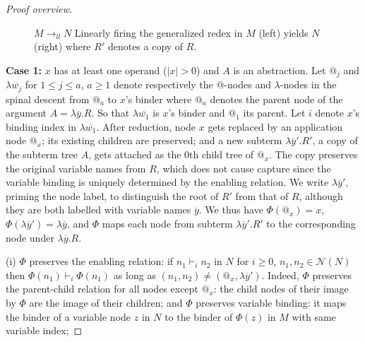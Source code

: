 \documentclass[xchauthor,chkrefs,GCNS,amsmath,amsthm,rotating,leaveRGB]{tcsg}
\theoremstyle{plain}
\theoremstyle{definition}
\newcommand{\Nodes}{\mathcal{N}}
\newcommand{\enables}{\vdash}
\newcommand{\llred}{\rightarrow_{ll}}
\begin{document}
\begin{proof}[Proof overview]
\begin{figure}
\begin{sgmlfig}
\end{sgmlfig}
\caption{$M\llred N$ Linearly firing the generalized redex in $M$ (left) yields
$N$ (right) where $R'$ denotes a copy of $R$.}\label{fig3}
\end{figure}

\textbf{Case 1:} $x$ has at least one operand ($|x|>0$) and $A$ is an
abstraction. Let $@_{j}$ and $\lambda \overline{w_{j}}$ for $1\leq j\leq a$,
$a\geq 1$ denote respectively the @-nodes and $\lambda $-nodes in the spinal
descent from $@_{a}$ to $x$'s binder where $@_{a}$ denotes the parent node of
the argument $A = \lambda \overline{y}. R$. So that $\lambda
\overline{w_{1}}$ is $x$'s binder and $@_{1}$ its parent. Let $i$ denote
$x$'s binding index in $\lambda \overline{w_{1}}$. After reduction, node $x$
gets replaced by an application node $@_{x}$; its existing children are
preserved; and a new subterm $\lambda \overline{y}'. R'$, a copy of the
subterm tree $A$, gets attached as the $0$th child tree of $@_{x}$. The copy
preserves the original variable names from $R$, which does not cause capture
since the variable binding is uniquely determined by the enabling relation.
We write $\lambda \overline{y}'$, priming the node label, to distinguish the
root of $R'$ from that of $R$, although they are both labelled with variable
names $\overline{y}$. We thus have $\Phi (@_{x}) = x$, $\Phi (\lambda
\overline{y}') = \lambda \overline{y}$, and $\Phi $ maps each node from
subterm $\lambda \overline{y}'. R'$  to the corresponding node under $\lambda
\overline{y}.R$.


(i) $\Phi $ preserves the enabling relation: if $n_{1} \enables _{i} n_{2}$
in $N$ for $i\geq 0$, $n_{1},n_{2} \in \Nodes (N)$ then $\Phi (n_{1})
\enables _{i} \Phi (n_{1})$ as long as $(n_{1},n_{2}) \neq (@_{x},\lambda
\overline{y}')$. Indeed, $\Phi $ preserves the parent-child relation for all
nodes except $@_{x}$: the child nodes of their image by $\Phi $ are the image
of their children; and $\Phi $ preserves variable binding: it maps the binder
of a variable node $z$ in $N$ to the binder of $\Phi (z)$ in $M$ with same
variable index;


\end{proof}
\end{document}
